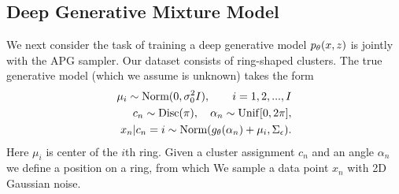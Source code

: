 \documentclass{article}
\theoremstyle{definition}
\begin{document}
\subsection{Deep Generative Mixture Model}
We next consider the task of training a deep generative model $p_\theta(x, z)$ is jointly with the APG sampler. Our dataset consists of ring-shaped clusters. The true generative model (which we assume is unknown) takes the form
\begin{align*}
    \mu_i \sim \text{Norm}(0, 
    \sigma_0^2 I), 
    \qquad i = 1, 2, ..., I \\
    c_n \sim \mathrm{Disc}(\pi), \quad \alpha_n \sim \mathrm{Unif}[0, 2\pi], \\
    x_n | c_n=i \sim \text{Norm}(g_\theta(\alpha_n) + \mu_i, \Sigma_\epsilon).
\end{align*}
Here $\mu_i$ is center of the $i$th ring. Given a cluster assignment $c_n$ and an angle $\alpha_n$ we define a position on a ring, from which We sample a data point $x_n$ with 2D Gaussian noise.

\end{document}
